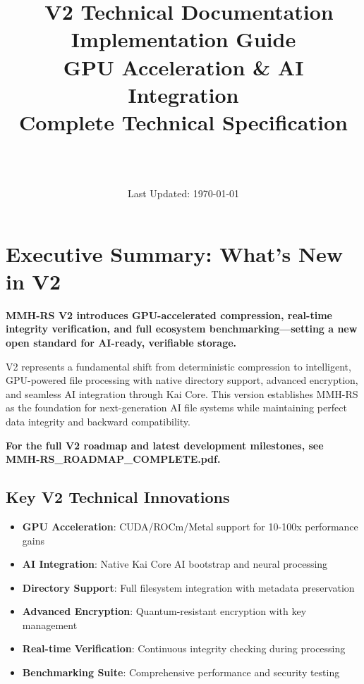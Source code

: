 \documentclass[12pt,a4paper]{article}
\title{\Huge\textbf{\project\ V2 Technical Documentation}\\[0.5cm]
\Large\textbf{Implementation Guide}\\[0.3cm]
\large GPU Acceleration \& AI Integration\\[0.5cm]
\large Complete Technical Specification}
\author{\Large\authorname\\[0.2cm]\email\\[0.2cm]\github}
\date{\large Last Updated: \today}
\begin{document}
\maketitle
\thispagestyle{empty}

\tableofcontents
\newpage

\section{Executive Summary: What's New in V2}

\begin{tcolorbox}[colback=v2blue!10,colframe=v2blue!50,title=\textbf{MMH-RS V2 Technical Summary}]
\textbf{MMH-RS V2 introduces GPU-accelerated compression, real-time integrity verification, and full ecosystem benchmarking—setting a new open standard for AI-ready, verifiable storage.}

V2 represents a fundamental shift from deterministic compression to intelligent, GPU-powered file processing with native directory support, advanced encryption, and seamless AI integration through Kai Core. This version establishes MMH-RS as the foundation for next-generation AI file systems while maintaining perfect data integrity and backward compatibility.
\end{tcolorbox}

\textbf{For the full V2 roadmap and latest development milestones, see MMH-RS\_ROADMAP\_COMPLETE.pdf.}

\subsection{Key V2 Technical Innovations}
\begin{itemize}
    \item \textbf{GPU Acceleration}: CUDA/ROCm/Metal support for 10-100x performance gains
    \item \textbf{AI Integration}: Native Kai Core AI bootstrap and neural processing
    \item \textbf{Directory Support}: Full filesystem integration with metadata preservation
    \item \textbf{Advanced Encryption}: Quantum-resistant encryption with key management
    \item \textbf{Real-time Verification}: Continuous integrity checking during processing
    \item \textbf{Benchmarking Suite}: Comprehensive performance and security testing
\end{itemize}
\end{document}
